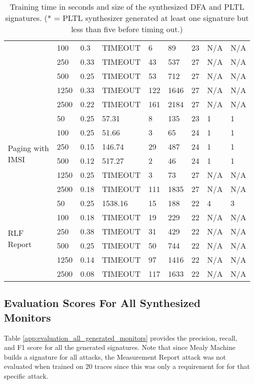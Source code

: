 \begin{table*}[]
{\begin{minipage}{2\columnwidth}
\begin{tabular}{|l|l|l|l|l|l|l|l|l|}
   & 100 & 0.3 & TIMEOUT & 6 & 89 & 23 & N/A & N/A \\ \cline{2-9}
   & 250 & 0.33 & TIMEOUT & 43 & 537 & 27 & N/A & N/A \\ \cline{2-9}
   & 500 & 0.25 & TIMEOUT & 53 & 712 & 27 & N/A & N/A \\ \cline{2-9}
   & 1250 & 0.33 & TIMEOUT & 122 & 1646 & 27 & N/A & N/A \\ \cline{2-9}
   & 2500 & 0.22 & TIMEOUT & 161 & 2184 & 27 & N/A & N/A \\ \hline
  \multirow{6}{*}{Paging with IMSI} & 50 & 0.25 & 57.31 & 8 & 135 & 23 & 1 & 1 \\ \cline{2-9}
   & 100 & 0.25 & 51.66 & 3 & 65 & 24 & 1 & 1 \\ \cline{2-9}
   & 250 & 0.15 & 146.74 & 29 & 487 & 24 & 1 & 1 \\ \cline{2-9}
   & 500 & 0.12 & 517.27 & 2 & 46 & 24 & 1 & 1 \\ \cline{2-9}
   & 1250 & 0.25 & TIMEOUT & 3 & 73 & 27 & N/A & N/A \\ \cline{2-9}
   & 2500 & 0.18 & TIMEOUT & 111 & 1835 & 27 & N/A & N/A \\ \hline
  \multirow{6}{*}{RLF Report} & 50 & 0.25 & 1538.16 & 15 & 188 & 22 & 4 & 3 \\ \cline{2-9}
   & 100 & 0.18 & TIMEOUT & 19 & 229 & 22 & N/A & N/A \\ \cline{2-9}
   & 250 & 0.38 & TIMEOUT & 31 & 429 & 22 & N/A & N/A \\ \cline{2-9}
   & 500 & 0.25 & TIMEOUT & 50 & 744 & 22 & N/A & N/A \\ \cline{2-9}
   & 1250 & 0.14 & TIMEOUT & 97 & 1416 & 22 & N/A & N/A \\ \cline{2-9}
   & 2500 & 0.08 & TIMEOUT & 117 & 1633 & 22 & N/A & N/A \\ \hline
  \end{tabular}
\end{minipage}}
\caption{Training time in seconds and size of the synthesized DFA and PLTL signatures. (* = PLTL synthesizer generated at least one signature but less than five before timing out.)}
\label{app:training_time_and_size_all_dfa_pltl}
\end{table*}
\newpage

\subsection{Evaluation Scores For All Synthesized Monitors}
Table \ref{app:evaluation_all_generated_monitors} provides the precision,
recall, and F1 score for all the generated signatures. Note that since Mealy Machine
builds a signature for all attacks, the Measurement Report attack was not evaluated
when trained on $20$ traces since this was only a requirement for \pltl for that
specific attack.

